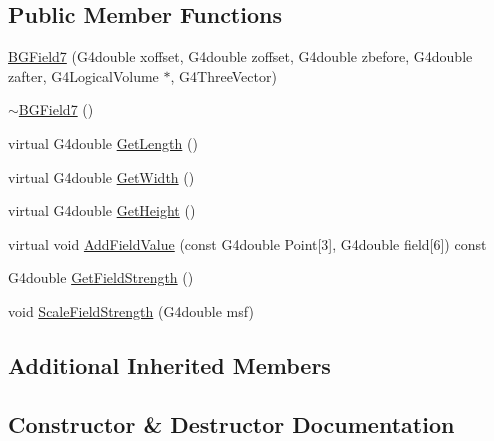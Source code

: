 \subsection*{Public Member Functions}
\begin{DoxyCompactItemize}
\item 
\hyperlink{classBGField7_a7a8a66516a7c721f5bbc537a11c74611}{B\+G\+Field7} (G4double xoffset, G4double zoffset, G4double zbefore, G4double zafter, G4\+Logical\+Volume $\ast$, G4\+Three\+Vector)
\item 
\hyperlink{classBGField7_a326fbde159d61d144d776515c101d4c3}{$\sim$\+B\+G\+Field7} ()
\item 
virtual G4double \hyperlink{classBGField7_a4a490c55acab01b0fdd558ed8117c20d}{Get\+Length} ()
\item 
virtual G4double \hyperlink{classBGField7_a26a7446a2a71f53d7e6562636cbd6dec}{Get\+Width} ()
\item 
virtual G4double \hyperlink{classBGField7_af997fdbf9563607d88ea8846674054f0}{Get\+Height} ()
\item 
virtual void \hyperlink{classBGField7_ace0f21a51ad1076f9cc7fc4558ee2ef7}{Add\+Field\+Value} (const G4double Point\mbox{[}3\mbox{]}, G4double field\mbox{[}6\mbox{]}) const 
\item 
G4double \hyperlink{classBGField7_a504c09a6ed73181e1131e745817d80e1}{Get\+Field\+Strength} ()
\item 
void \hyperlink{classBGField7_af175b7fc74bed2669bfb3036d6475dbb}{Scale\+Field\+Strength} (G4double msf)
\end{DoxyCompactItemize}
\subsection*{Additional Inherited Members}


\subsection{Constructor \& Destructor Documentation}
